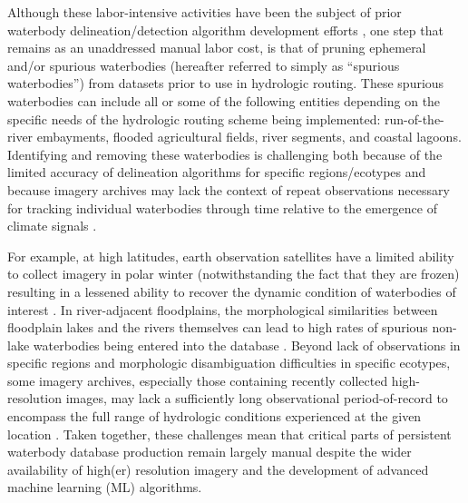 \documentclass{article}
\begin{document}
Although these labor-intensive activities have been the subject of prior waterbody delineation/detection algorithm development efforts \citep{khandelwal2022realsat}, one step that remains as an unaddressed manual labor cost, is that of pruning ephemeral and/or spurious waterbodies (hereafter referred to simply as “spurious waterbodies”) from datasets prior to use in hydrologic routing. These spurious waterbodies can include all or some of the following entities depending on the specific needs of the hydrologic routing scheme being implemented: run-of-the-river embayments, flooded agricultural fields, river segments, and coastal lagoons. Identifying and removing these waterbodies is challenging both because of the limited accuracy of delineation algorithms for specific regions/ecotypes and because imagery archives may lack the context of repeat observations necessary for tracking individual waterbodies through time relative to the emergence of climate signals \citep{hawkinsTimeEmergenceClimate2012,khandelwal2022realsat}. 

For example, at high latitudes, earth observation satellites have a limited ability to collect imagery in polar winter (notwithstanding the fact that they are frozen) resulting in a lessened ability to recover the dynamic condition of waterbodies of interest \citep{musterPeRLCircumArcticPermafrost2017,pekelHighresolutionMappingGlobal2016}. In river-adjacent floodplains, the morphological similarities between floodplain lakes and the rivers themselves can lead to high rates of spurious non-lake waterbodies being entered into the database \citep{piMappingGlobalLake2022}. Beyond lack of observations in specific regions and morphologic disambiguation difficulties in specific ecotypes, some imagery archives, especially those containing recently collected high-resolution images, may lack a sufficiently long observational period-of-record to encompass the full range of hydrologic conditions experienced at the given location \citep{wulderCurrentStatusLandsat2019}. Taken together, these challenges mean that critical parts of persistent waterbody database production remain largely manual despite the wider availability of high(er) resolution imagery and the development of advanced machine learning (ML) algorithms.
\end{document}
